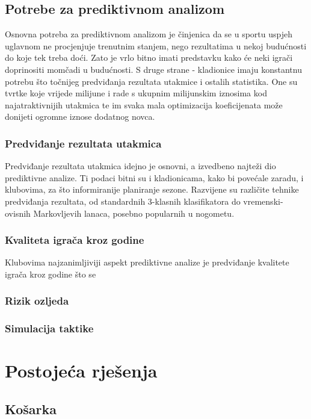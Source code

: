 \documentclass{ferseminar}
\begin{document}
\subsection{Potrebe za prediktivnom analizom}

Osnovna potreba za prediktivnom analizom je činjenica da se u sportu uspjeh uglavnom ne procjenjuje trenutnim stanjem, nego rezultatima u nekoj budućnosti do koje tek treba doći. Zato je vrlo bitno imati predstavku kako će neki igrači doprinositi momčadi u budućnosti.
\newline
S druge strane - kladionice imaju konstantnu potrebu što točnijeg predviđanja rezultata utakmice i ostalih statistika. One su tvrtke koje vrijede milijune i rade s ukupnim milijunskim iznosima kod najatraktivnijih utakmica te im svaka mala optimizacija koeficijenata može donijeti ogromne iznose dodatnog novca.

\subsubsection{Predviđanje rezultata utakmica}
Predviđanje rezultata utakmica idejno je osnovni, a izvedbeno najteži dio prediktivne analize. Ti podaci bitni su i kladionicama, kako bi povećale zaradu, i klubovima, za što informiranije planiranje sezone. Razvijene su različite tehnike predviđanja rezultata, od standardnih 3-klasnih klasifikatora do vremenski-ovisnih Markovljevih lanaca, posebno popularnih u nogometu.

\subsubsection{Kvaliteta igrača kroz godine}
Klubovima najzanimljiviji aspekt prediktivne analize je predviđanje kvalitete igrača kroz godine što se 

\subsubsection{Rizik ozljeda}

\subsubsection{Simulacija taktike}

\section{Postojeća rješenja}

\subsection{Košarka}
\end{document}
